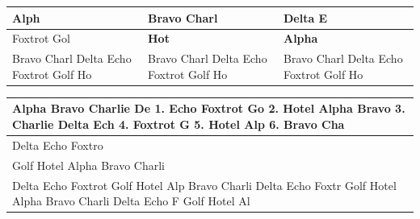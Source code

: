 \documentclass[11pt,a4paper]{article}
\begin{document}
\begin{table}[h]
\begin{tabular}{|l|l|l|}
\hline
Alph & Bravo Charl & Delta E \\ \hline
Foxtrot Gol & \textbf{Hot} & \textbf{Alpha}  \\ \hline
Bravo Charl  Delta Echo Foxtrot Golf Ho & Bravo Charl  Delta Echo Foxtrot Golf Ho & Bravo Charl  Delta Echo Foxtrot Golf Ho \\ \hline
\end{tabular}
\end{table}

\begin{table}[h]
\begin{tabular}{|l|}
\hline
Alpha Bravo Charlie De  1. Echo Foxtrot Go 2. Hotel Alpha Bravo 3. Charlie Delta Ech 4. Foxtrot G 5. Hotel Alp 6. Bravo Cha \\ \hline
Delta Echo Foxtro \\ \hline
Golf Hotel Alpha Bravo  Charli \\ \hline
Delta Echo Foxtrot Golf Hotel Alp  Bravo Charli  Delta Echo Foxtr  Golf Hotel Alpha   Bravo Charli  Delta Echo F  Golf Hotel Al \\ \hline
\end{tabular}
\end{table}
\end{document}
